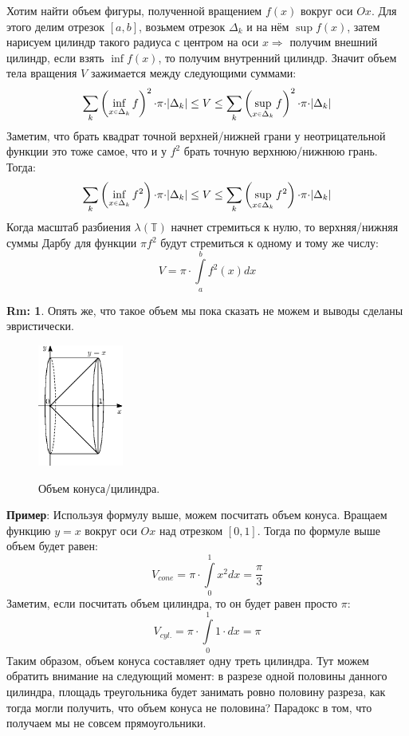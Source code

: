 \documentclass[12pt]{article}
\newcommand{\MTB}{\mathbb{T}}
\theoremstyle{definition}
\newtheorem{rem}{Rm:}
\newcommand{\ddint}[2]{\displaystyle\int\limits_{#1}^{#2}}
\newcommand{\smallerrel}[1]{\mathrel{\mathpalette\smallerrelaux{#1}}}
\newcommand{\smallerrelaux}[2]{\raisebox{.1ex}{\scalebox{.75}{$#1#2$}}}
\newcommand{\smallin}{\smallerrel{\in}}
\begin{document}
Хотим найти объем фигуры, полученной вращением $f(x)$ вокруг оси $Ox$. Для этого делим отрезок $[a,b]$, возьмем отрезок $\Delta_k$ и на нём $\sup f(x)$, затем нарисуем цилиндр такого радиуса с центром на оси $x\Rightarrow$	получим внешний цилиндр, если взять $\inf f(x)$, то получим внутренний цилиндр. Значит объем тела вращения $V$ зажимается между следующими суммами:
$$
	\sum\limits_k \left(\inf\limits_{x \smallin \Delta_k}f\right)^2{\cdot}\pi{\cdot}|\Delta_k|	\leq V \leq \sum\limits_k \left(\sup\limits_{x \smallin \Delta_k}f\right)^2{\cdot}\pi{\cdot}|\Delta_k|	
$$
Заметим, что брать квадрат точной верхней/нижней грани у неотрицательной функции  это тоже самое, что и у $f^2$ брать точную верхнюю/нижнюю грань. Тогда:
$$
	\sum\limits_k \left(\inf\limits_{x \smallin \Delta_k}f^2\right){\cdot}\pi{\cdot}|\Delta_k|	\leq V \leq \sum\limits_k \left(\sup\limits_{x \smallin \Delta_k}f^2\right){\cdot}\pi{\cdot}|\Delta_k|
$$
Когда масштаб разбиения $\lambda(\MTB)$ начнет стремиться к нулю, то верхняя/нижняя суммы Дарбу для функции $\pi f^2$ будут стремиться к одному и тому же числу:
$$
	V = \pi {\cdot}\!\ddint{a}{b}f^2(x)dx
$$
\begin{rem}
	Опять же, что такое объем мы пока сказать не можем и выводы сделаны эвристически.
\end{rem} 
\begin{figure}[H]
	\centering
	\includegraphics[width=0.25\textwidth]{26_4.eps}
	\label{26_4}
	\caption{Объем конуса/цилиндра.}
	\label{fig:Объем конуса/цилиндра}
\end{figure} 
\textbf{Пример}: Используя формулу выше, можем посчитать объем конуса. Вращаем функцию $y = x$ вокруг оси $Ox$ над отрезком $[0,1]$. Тогда по формуле выше объем будет равен:
$$
	V_{cone} = \pi{\cdot}\!\ddint{0}{1}x^2dx = \dfrac{\pi}{3}
$$
Заметим, если посчитать объем цилиндра, то он будет равен просто $\pi$:
$$
	V_{cyl.} = \pi{\cdot}\! \ddint{0}{1}1{\cdot}dx = \pi
$$
Таким образом, объем конуса составляет одну треть цилиндра. Тут можем обратить внимание на следующий момент: в разрезе одной половины данного цилиндра, площадь треугольника будет занимать ровно половину разреза, как тогда могли получить, что объем конуса не половина? Парадокс в том, что получаем мы не совсем прямоугольники.
\end{document}
